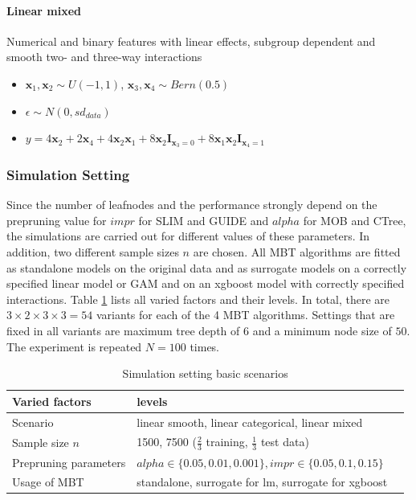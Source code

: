 \paragraph{Linear mixed}
Numerical and binary features with linear effects, subgroup dependent and smooth two- and three-way interactions
\begin{itemize}
    \item $\textbf{x}_1, \textbf{x}_2 \sim U(-1,1)$, $\textbf{x}_3, \textbf{x}_4 \sim Bern(0.5)$
    \item $\epsilon \sim N(0, sd_{data})$
    \item $y = 4   \textbf{x}_2 + 2   \textbf{x}_4  + 4   \textbf{x}_2   \textbf{x}_1 + 8   \textbf{x}_2   \mathbf{I}_{\textbf{x}_3 = 0} +  8 \textbf{x}_1   \textbf{x}_2 \mathbf{I}_{\textbf{x}_4 = 1}$
\end{itemize}


\subsubsection{Simulation Setting}
Since the number of leafnodes and the performance strongly depend on the prepruning value for $impr$ for SLIM and GUIDE and $alpha$ for MOB and CTree, the simulations are carried out for different values of these parameters. In addition, two different sample sizes $n$ are chosen. 
All MBT algorithms are fitted as standalone models on the original data and as surrogate models on a correctly specified linear model or GAM and on an xgboost model with correctly specified interactions. 
Table \ref{tab:simulation_setting} lists all varied factors and their levels. In total, there are $3 \times 2 \times 3 \times 3 = 54$ variants for each of the 4 MBT algorithms.
Settings that are fixed in all variants are maximum tree depth of $6$ and a minimum node size of $50$.
The experiment is repeated $N = 100$ times.

\begin{table} \label{tab:simulation_setting}

\caption{Simulation setting basic scenarios}
\centering \small
\begin{tabular}[t]{lll}
\hline
Varied factors & levels \\
\hline
Scenario  & linear smooth, linear categorical, linear mixed\\
Sample size $n$  & 1500, 7500 ($\frac{2}{3}$  training, $\frac{1}{3}$ test data)\\
Prepruning parameters   & $alpha \in \{0.05,0.01,0.001\}, impr \in \{0.05,0.1,0.15\}$ \\
Usage of MBT  & standalone, surrogate for lm, surrogate for xgboost \\ 
\hline
\end{tabular}
\end{table}

